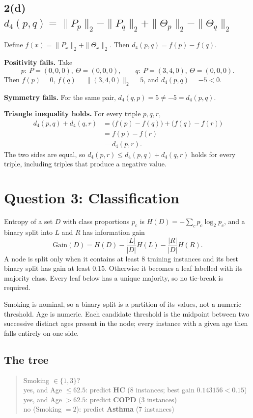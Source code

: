 \documentclass[11pt]{article}
\begin{document}
\subsection*{2(d) $d_4(p,q)=\|P_p\|_2-\|P_q\|_2+\|\Theta_p\|_2-\|\Theta_q\|_2$}

Define $f(x)=\|P_x\|_2+\|\Theta_x\|_2$. Then $d_4(p,q)=f(p)-f(q)$.

\textbf{Positivity fails.} Take
\[
p:\ P=(0,0,0),\ \Theta=(0,0,0),
\qquad
q:\ P=(3,4,0),\ \Theta=(0,0,0).
\]
Then $f(p)=0$, $f(q)=\|(3,4,0)\|_2=5$, and $d_4(p,q)=-5<0$.

\textbf{Symmetry fails.} For the same pair, $d_4(q,p)=5\neq -5=d_4(p,q)$.

\textbf{Triangle inequality holds.} For every triple $p,q,r$,
\begin{align*}
d_4(p,q)+d_4(q,r)
&= \bigl(f(p)-f(q)\bigr)+\bigl(f(q)-f(r)\bigr)\\
&= f(p)-f(r)\\
&= d_4(p,r).
\end{align*}
The two sides are equal, so $d_4(p,r)\le d_4(p,q)+d_4(q,r)$ holds for every triple, including triples that produce a negative value.

\section{Question 3: Classification}

Entropy of a set $D$ with class proportions $p_c$ is $H(D)=-\sum_c p_c\log_2 p_c$, and a binary split into $L$ and $R$ has information gain
\[
\mathrm{Gain}(D)=H(D)-\frac{|L|}{|D|}H(L)-\frac{|R|}{|D|}H(R).
\]
A node is split only when it contains at least 8 training instances and its best binary split has gain at least $0.15$. Otherwise it becomes a leaf labelled with its majority class. Every leaf below has a unique majority, so no tie-break is required.

Smoking is nominal, so a binary split is a partition of its values, not a numeric threshold. Age is numeric. Each candidate threshold is the midpoint between two successive distinct ages present in the node; every instance with a given age then falls entirely on one side.

\subsection*{The tree}

\begin{quote}
Smoking $\in\{1,3\}$?\\
\quad yes, and Age $\le 62.5$: predict \textbf{HC} \quad (8 instances; best gain $0.143156<0.15$)\\
\quad yes, and Age $> 62.5$: predict \textbf{COPD} \quad (3 instances)\\
\quad no (Smoking $=2$): predict \textbf{Asthma} \quad (7 instances)
\end{quote}
\end{document}
